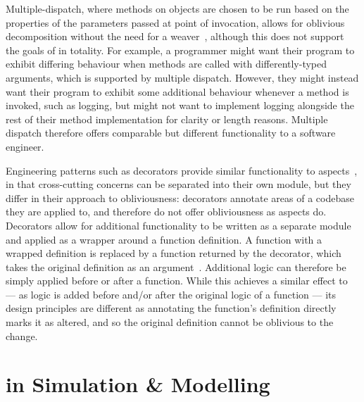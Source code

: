 Multiple-dispatch, where methods on objects are chosen to be run based on the
properties of the parameters passed at point of invocation, allows for oblivious
decomposition without the need for a weaver~\cite{dozsa2008lisp}, although this
does not support the goals of \aspectorientation{} in totality. For example, a
programmer might want their program to exhibit differing behaviour when methods
are called with differently-typed arguments, which is supported by multiple
dispatch. However, they might instead want their program to exhibit some
additional behaviour whenever a method is invoked, such as logging, but might
not want to implement logging alongside the rest of their method implementation
for clarity or length reasons. Multiple dispatch therefore offers comparable but
different functionality to a software engineer.

Engineering patterns such as decorators provide similar functionality to
aspects~\cite{friesel2017annotations}, in that cross-cutting concerns can be
separated into their own module, but they differ in their approach to
obliviousness: decorators annotate areas of a codebase they are applied to, and
therefore do not offer obliviousness as aspects do. Decorators allow for
additional functionality to be written as a separate module and applied as a
wrapper around a function definition. A function with a wrapped
definition is replaced by a function returned by the decorator, which takes the
original definition as an argument~\citep{gof_design_patterns}. Additional logic
can therefore be simply applied before or after a function. While this achieves
a similar effect to \aspectorientation{} --- as logic is added before and/or after
the original logic of a function --- its design principles are different as
annotating the function's definition directly marks it as altered, and so the
original definition cannot be oblivious to the change.




\section{\AspectOrientation{} in Simulation \& Modelling}
\label{sec:ao_and_modelling}


